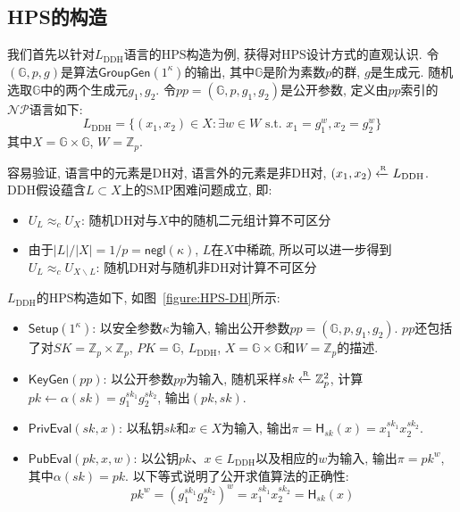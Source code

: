 \subsection{HPS的构造}
我们首先以针对$L_\text{DDH}$语言的HPS构造为例, 获得对HPS设计方式的直观认识. 
令$(\mathbb{G}, p, g)$是算法$\mathsf{GroupGen}(1^\kappa)$的输出, 
其中$\mathbb{G}$是阶为素数$p$的群, $g$是生成元. 随机选取$\mathbb{G}$中的两个生成元$g_1, g_2$. 
令$pp = (\mathbb{G}, p, g_1, g_2)$是公开参数, 定义由$pp$索引的$\mathcal{NP}$语言如下:  
\begin{equation*}
    L_\text{DDH} = \{(x_1, x_2) \in X: \exists w \in W \text{~s.t.~} x_1 = g_1^w, x_2 = g_2^w\}
\end{equation*}
其中$X = \mathbb{G} \times \mathbb{G}$, $W = \mathbb{Z}_p$. 

容易验证, 语言中的元素是DH对, 语言外的元素是非DH对, $(x_1, x_2) \xleftarrow{\textup{\tiny R}} L_\text{DDH}$.  
DDH假设蕴含$L \subset X$上的SMP困难问题成立, 即: 
\begin{itemize}
    \item $U_L \approx_c U_X$: 随机DH对与$X$中的随机二元组计算不可区分

    \item 由于$|L|/|X| = 1/p = \mathsf{negl}(\kappa)$, $L$在$X$中稀疏, 
        所以可以进一步得到$U_L \approx_c U_{X \backslash L}$: 随机DH对与随机非DH对计算不可区分
\end{itemize}

\begin{construction}\label{construction:HPS-for-DDH}
$L_\text{DDH}$的HPS构造如下, 如图~\ref{figure:HPS-DH}所示:
\begin{itemize}
\item $\mathsf{Setup}(1^\kappa)$: 以安全参数$\kappa$为输入, 输出公开参数$pp = (\mathbb{G}, p, g_1, g_2)$. 
    $pp$还包括了对$SK = \mathbb{Z}_p \times \mathbb{Z}_p$, $PK = \mathbb{G}$, $L_\text{DDH}$, 
    $X = \mathbb{G} \times \mathbb{G}$和$W = \mathbb{Z}_p$的描述.   

\item $\mathsf{KeyGen}(pp)$: 以公开参数$pp$为输入, 随机采样$sk \xleftarrow{\textup{\tiny R}} \mathbb{Z}_p^2$, 
    计算$pk \leftarrow \alpha(sk) = g_1^{sk_1} g_2^{sk_2}$, 输出$(pk, sk)$. 

\item $\mathsf{PrivEval}(sk, x)$: 以私钥$sk$和$x \in X$为输入, 输出$\pi = \mathsf{H}_{sk}(x) = x_1^{sk_1} x_2^{sk_2}$. 

\item $\mathsf{PubEval}(pk, x, w)$: 以公钥$pk$、$x \in L_\text{DDH}$以及相应的$w$为输入, 输出$\pi = pk^w$, 其中$\alpha(sk) = pk$. 
    以下等式说明了公开求值算法的正确性:
    \begin{equation*}
        pk^w = (g_1^{sk_1} g_2^{sk_2})^w = x_1^{sk_1} x_2^{sk_2} = \mathsf{H}_{sk}(x)
    \end{equation*}
\end{itemize}
\end{construction}

